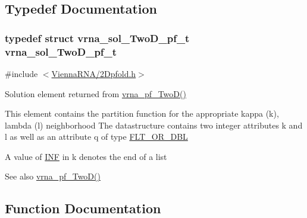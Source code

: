 \subsection{Typedef Documentation}
\subsubsection[{\texorpdfstring{vrna\+\_\+sol\+\_\+\+Two\+D\+\_\+pf\+\_\+t}{vrna_sol_TwoD_pf_t}}]{\setlength{\rightskip}{0pt plus 5cm}typedef struct {\bf vrna\+\_\+sol\+\_\+\+Two\+D\+\_\+pf\+\_\+t}  {\bf vrna\+\_\+sol\+\_\+\+Two\+D\+\_\+pf\+\_\+t}}\hypertarget{group__kl__neighborhood__pf_ga5e449fbd695406aabd2bcabddc374621}{}\label{group__kl__neighborhood__pf_ga5e449fbd695406aabd2bcabddc374621}


{\ttfamily \#include $<$\hyperlink{2Dpfold_8h}{Vienna\+R\+N\+A/2\+Dpfold.\+h}$>$}



Solution element returned from \hyperlink{group__kl__neighborhood__pf_ga0bc3427689bd09da09b8b3094a27f836}{vrna\+\_\+pf\+\_\+\+Two\+D()} 

This element contains the partition function for the appropriate kappa (k), lambda (l) neighborhood The datastructure contains two integer attributes \textquotesingle{}k\textquotesingle{} and \textquotesingle{}l\textquotesingle{} as well as an attribute \textquotesingle{}q\textquotesingle{} of type \hyperlink{group__data__structures_ga31125aeace516926bf7f251f759b6126}{F\+L\+T\+\_\+\+O\+R\+\_\+\+D\+BL}

A value of \hyperlink{energy__const_8h_a12c2040f25d8e3a7b9e1c2024c618cb6}{I\+NF} in k denotes the end of a list

\begin{DoxySeeAlso}{See also}
\hyperlink{group__kl__neighborhood__pf_ga0bc3427689bd09da09b8b3094a27f836}{vrna\+\_\+pf\+\_\+\+Two\+D()} 
\end{DoxySeeAlso}


\subsection{Function Documentation}
